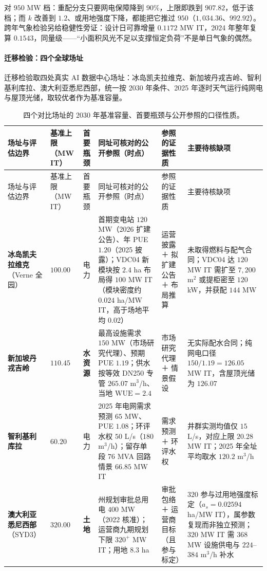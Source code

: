 对 $950$ MW 档：重配分支只要网电保障降到 $90\%$，上限即跌到 $907.82$，低于该档；而 $k$ 改善到 $1.2$、或用地强度下降，都能把它推过 $950$（$1{,}034.36$、$992.92$）。跨年气象检验另给稳健性旁证：设计日可靠增量 $0.1172$ MW IT，2024 年整年复算 $0.1543$，同量级——“小面积风光不足以支撑恒定负荷”不是单日气象的偶然。\cite{apxref10}

\paragraph{迁移检验：四个全球场址}\label{sec:migration}

迁移检验取四处真实 AI 数据中心场址：冰岛凯夫拉维克、新加坡丹戎吉岭、智利基利库拉、澳大利亚悉尼西部，统一按 2030 年条件、2025 年逐时天气运行纯网电与屋顶光储，取较优者作为基准容量。\cite{apxref15}

{\footnotesize
\setlength{\tabcolsep}{3pt}
\begin{longtable}{@{}p{}p{}p{}p{}p{}p{}@{}}
\caption{四个对比场址的 2030 年基准容量、首要瓶颈与公开参照的口径性质。}
\label{tab:four-sites}\\
\toprule
场址与评估边界 & 基准上限（MW IT） & 首要瓶颈 & 同址可核对的公开参照（时点） & 参照的证据性质 & 主要待核缺项 \\
\midrule
\endfirsthead
\toprule
场址与评估边界 & 基准上限（MW IT） & 首要瓶颈 & 同址可核对的公开参照（时点） & 参照的证据性质 & 主要待核缺项 \\
\midrule
\endhead
\bottomrule
\endlastfoot
\textbf{冰岛凯夫拉维克}（Verne 全园） & $100.00$ & 电力 & 首期变电站 $120$ MW（2026 扩建公告）、年 PUE $1.20$（2025 披露）；VDC04 新模块按 $2.4$ ha 布局得 $100$ MW IT（模块密度约 $0.024$ ha/MW IT，高于场地平均 $0.02$）\cite{apxref16,apxref17,apxref18} & 运营披露 ＋ 拟扩建公告 ＋ 布局推算 & 未取得燃料与配气合同；VDC04 达 $120$ MW IT 需扩至 $7{,}200$ m$^2$ 或提柜密至 $120$ kW，并获配 $144$ MW \\
\textbf{新加坡丹戎吉岭} & $110.45$ & \textbf{水资源} & 最高设施需求 $150$ MW（市场研究代理）、预期 PUE $1.19$；供水按等效 DN250 专管 $265.07$ m$^3$/h、当地 $\mathrm{WUE}=2.4$ \cite{apxref19,apxref20,apxref21} & 市场研究代理 ＋ 情景假设 & 无实际配水合同；纯网电口径 $150/1.19=126.05$ MW IT，含屋顶光储为 $126.07$ \\
\textbf{智利基利库拉} & $60.20$ & 电力 & 2025 年电网需求预测 $65$ MW、PUE $1.08$；环评水权 $50$ L/s（$180$ m$^3$/h）；留存单段 $76$ MVA 回路情景 $66.85$ MW IT \cite{apxref22,apxref23,apxref24} & 需求预测 ＋ 环评水权 & 井群实测均值仅 $15$ L/s，对应上限 $20.28$ MW IT；2025 年全址平均取水 $120.2$ m$^3$/h \\
\textbf{澳大利亚悉尼西部}（SYD3） & $320.00$ & \textbf{土地} & 州规划审批总用电 $400$ MW（2022 核准）；运营商九期规划下限 $320^+$ MW IT；用地 $8.3$ ha \cite{apxref25,apxref26,apxref27} & 审批包络 ＋ 运营商目标（且参与标定） & $320$ 参与过用地强度标定（$a_s=0.02594$ ha/MW IT），属参数复现而非独立预测；$320$ MW IT 需 $368$ MW 设施供电与 $224$–$384$ m$^3$/h 补水 \\
\end{longtable}
\par}


